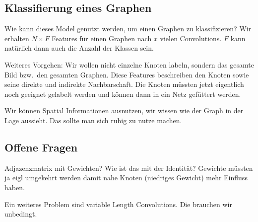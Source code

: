 \documentclass{scrartcl}
\begin{document}
\subsection{Klassifierung eines Graphen}

Wie kann dieses Model genutzt werden, um einen Graphen zu klassifizieren?
Wir erhalten $N \times F$ Features für einen Graphen nach $x$ vielen Convolutions.
$F$ kann natürlich dann auch die Anzahl der Klassen sein.

Weiteres Vorgehen:
Wir wollen nicht einzelne Knoten labeln, sondern das gesamte Bild bzw.\ den gesamten Graphen.
Diese Features beschreiben den Knoten sowie seine direkte und indirekte Nachbarschaft.
Die Knoten müssten jetzt eigentlich noch geeignet gelabelt werden und können dann in ein Netz gefüttert werden.

Wir können Spatial Informationen ausnutzen, wir wissen wie der Graph in der Lage aussieht.
Das sollte man sich ruhig zu nutze machen.

\subsection{Offene Fragen}

Adjazenzmatrix mit Gewichten? Wie ist das mit der Identität? Gewichte müssten ja eigl umgekehrt werden damit nahe Knoten (niedriges Gewicht) mehr Einfluss haben.

Ein weiteres Problem sind variable Length Convolutions.
Die brauchen wir unbedingt.
\end{document}
